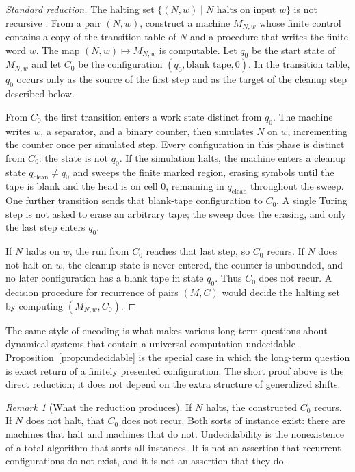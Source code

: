 \documentclass[11pt]{article}
\theoremstyle{definition}
\theoremstyle{remark}
\newtheorem{remark}[theorem]{Remark}
\begin{document}
\begin{proof}[Standard reduction]
The halting set \(\{(N,w) \mid N \text{ halts on input } w\}\) is not recursive \citep{turing1936}.
From a pair \((N,w)\), construct a machine \(M_{N,w}\) whose finite control contains a copy of the transition table of \(N\) and a procedure that writes the finite word \(w\).
The map \((N,w)\mapsto M_{N,w}\) is computable.
Let \(q_0\) be the start state of \(M_{N,w}\) and let \(C_0\) be the configuration \((q_0,\text{blank tape},0)\).
In the transition table, \(q_0\) occurs only as the source of the first step and as the target of the cleanup step described below.

From \(C_0\) the first transition enters a work state distinct from \(q_0\).
The machine writes \(w\), a separator, and a binary counter, then simulates \(N\) on \(w\), incrementing the counter once per simulated step.
Every configuration in this phase is distinct from \(C_0\): the state is not \(q_0\).
If the simulation halts, the machine enters a cleanup state \(q_{\mathrm{clean}}\neq q_0\) and sweeps the finite marked region, erasing symbols until the tape is blank and the head is on cell \(0\), remaining in \(q_{\mathrm{clean}}\) throughout the sweep.
One further transition sends that blank-tape configuration to \(C_0\).
A single Turing step is not asked to erase an arbitrary tape; the sweep does the erasing, and only the last step enters \(q_0\).

If \(N\) halts on \(w\), the run from \(C_0\) reaches that last step, so \(C_0\) recurs.
If \(N\) does not halt on \(w\), the cleanup state is never entered, the counter is unbounded, and no later configuration has a blank tape in state \(q_0\).
Thus \(C_0\) does not recur.
A decision procedure for recurrence of pairs \((M,C)\) would decide the halting set by computing \((M_{N,w},C_0)\).
\end{proof}

The same style of encoding is what makes various long-term questions about dynamical systems that contain a universal computation undecidable \citep{moore1990}.
Proposition~\ref{prop:undecidable} is the special case in which the long-term question is exact return of a finitely presented configuration.
The short proof above is the direct reduction; it does not depend on the extra structure of generalized shifts.

\begin{remark}[What the reduction produces]
\label{rem:both}
If \(N\) halts, the constructed \(C_0\) recurs.
If \(N\) does not halt, that \(C_0\) does not recur.
Both sorts of instance exist: there are machines that halt and machines that do not.
Undecidability is the nonexistence of a total algorithm that sorts all instances.
It is not an assertion that recurrent configurations do not exist, and it is not an assertion that they do.
\end{remark}
\end{document}
